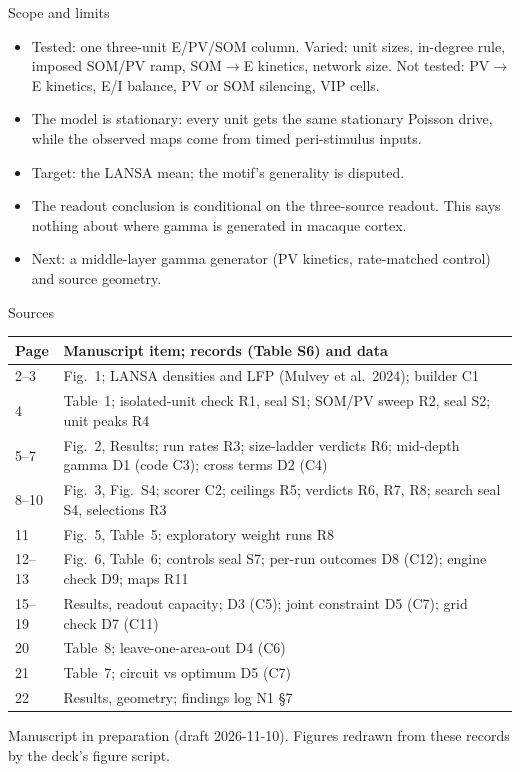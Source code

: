 \documentclass[aspectratio=169,11pt,usepdftitle=false]{beamer}
\newcommand{\src}[1]{{\color{dim}\scriptsize #1}\par\vspace{0.05cm}}
\begin{document}
\begin{frame}{Scope and limits}
\vspace{0.3cm}
\centering
\begin{minipage}{0.95\textwidth}\raggedright\small
\begin{itemize}\setlength{\itemsep}{0.6em}
\item Tested: one three-unit E/PV/SOM column. Varied: unit sizes, in-degree rule, imposed SOM/PV ramp, SOM$\to$E kinetics, network size. Not tested: PV$\to$E kinetics, E/I balance, PV or SOM silencing, VIP cells.
\item The model is stationary: every unit gets the same stationary Poisson drive, while the observed maps come from timed peri-stimulus inputs.
\item Target: the LANSA mean; the motif's generality is disputed.
\item The readout conclusion is conditional on the three-source readout. This says nothing about where gamma is generated in macaque cortex.
\item Next: a middle-layer gamma generator (PV kinetics, rate-matched control) and source geometry.
\end{itemize}
\end{minipage}
\vfill
\end{frame}

\begin{frame}{Sources}
\fontsize{8}{9.5}\selectfont
\begin{tabular}{@{}lp{}@{}}
\toprule
Page & Manuscript item; records (Table S6) and data \\
\midrule
2--3 & Fig.~1; LANSA densities and LFP (Mulvey et al.\ 2024); builder C1 \\
4 & Table~1; isolated-unit check R1, seal S1; SOM/PV sweep R2, seal S2; unit peaks R4 \\
5--7 & Fig.~2, Results; run rates R3; size-ladder verdicts R6; mid-depth gamma D1 (code C3); cross terms D2 (C4) \\
8--10 & Fig.~3, Fig.~S4; scorer C2; ceilings R5; verdicts R6, R7, R8; search seal S4, selections R3 \\
11 & Fig.~5, Table~5; exploratory weight runs R8 \\
12--13 & Fig.~6, Table~6; controls seal S7; per-run outcomes D8 (C12); engine check D9; maps R11 \\
15--19 & Results, readout capacity; D3 (C5); joint constraint D5 (C7); grid check D7 (C11) \\
20 & Table~8; leave-one-area-out D4 (C6) \\
21 & Table~7; circuit vs optimum D5 (C7) \\
22 & Results, geometry; findings log N1 \S7 \\
\bottomrule
\end{tabular}
\vfill
\src{Manuscript in preparation (draft 2026-11-10). Figures redrawn from these records by the deck's figure script.}
\end{frame}
\end{document}
